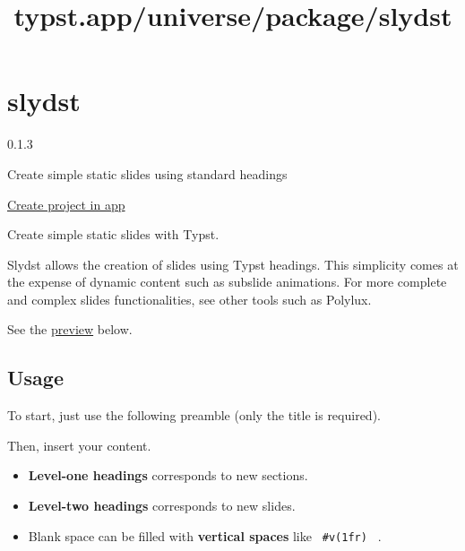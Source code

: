 \title{typst.app/universe/package/slydst}

\label{banner}
\label{template-thumbnail}

\section{slydst}\label{slydst}

{ 0.1.3 }

Create simple static slides using standard headings

\href{/app?template=slydst&version=0.1.3}{Create project in app}

\label{readme}
Create simple static slides with Typst.

Slydst allows the creation of slides using Typst headings. This
simplicity comes at the expense of dynamic content such as subslide
animations. For more complete and complex slides functionalities, see
other tools such as Polylux.

See the
\href{https://github.com/typst/packages/raw/main/packages/preview/slydst/0.1.3/\#example}{preview}
below.

\subsection{Usage}\label{usage}

To start, just use the following preamble (only the title is required).

\begin{Shaded}
\begin{Highlighting}[]

\NormalTok{)}

\end{Highlighting}
\end{Shaded}

Then, insert your content.

\begin{itemize}
\tightlist
\item
  \textbf{Level-one headings} corresponds to new sections.
\item
  \textbf{Level-two headings} corresponds to new slides.
\item
  Blank space can be filled with \textbf{vertical spaces} like
  \texttt{\ \#v(1fr)\ } .
\end{itemize}

